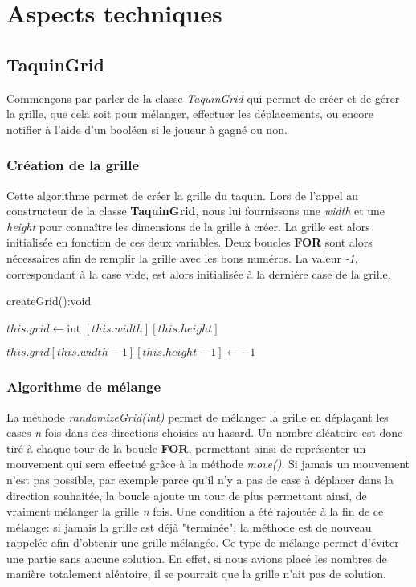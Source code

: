 \chapter{Aspects techniques}

	\section{TaquinGrid}

		Commençons par parler de la classe \textit{TaquinGrid} qui permet de créer et de gérer la grille, que cela soit pour mélanger, effectuer les déplacements, ou encore notifier à l'aide d'un booléen si le joueur à gagné ou non.

		\subsection{Création de la grille}

			Cette algorithme permet de créer la grille du taquin. Lors de l'appel au constructeur de la classe \textbf{TaquinGrid}, nous lui fournissons une \textit{width} et une \textit{height} pour connaître les dimensions de la grille à créer. La grille est alors initialisée en fonction de ces deux variables. Deux boucles \textbf{FOR} sont alors nécessaires afin de remplir la grille avec les bons numéros. La valeur \textit{-1}, correspondant à la case vide, est alors initialisée à la dernière case de la grille.

			\begin{algorithm}[H]
				\caption{createGrid():void}
				$this.grid \leftarrow $int $[this.width][this.height]$


				$this.grid[this.width-1][this.height-1] \leftarrow -1$
			\end{algorithm}

		\subsection{Algorithme de mélange}

			La méthode \textit{randomizeGrid(int)} permet de mélanger la grille en déplaçant les cases \textit{n} fois dans des directions choisies au hasard. Un nombre aléatoire est donc tiré à chaque tour de la boucle \textbf{FOR}, permettant ainsi de représenter un mouvement qui sera effectué grâce à la méthode \textit{move()}. Si jamais un mouvement n'est pas possible, par exemple parce qu'il n'y a pas de case à déplacer dans la direction souhaitée, la boucle ajoute un tour de plus permettant ainsi, de vraiment mélanger la grille \textit{n} fois. Une condition a été rajoutée à la fin de ce mélange: si jamais la grille est déjà "terminée", la méthode est de nouveau rappelée afin d'obtenir une grille mélangée. Ce type de mélange permet d'éviter une partie sans aucune solution. En effet, si nous avions placé les nombres de manière totalement aléatoire, il se pourrait que la grille n'ait pas de solution.

